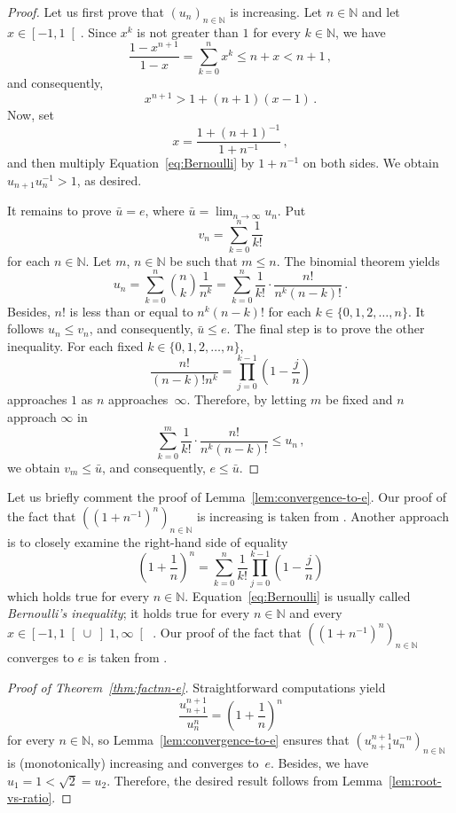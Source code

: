 \documentclass[12pt]{article}
\newcommand{\bN}{\mathbb{N}} %
\begin{document}
\begin{proof}
  Let us first prove that $\left( u_n \right)_{n \in \bN}$ is increasing.
  Let $n \in \bN$ and let $x \in \left[- 1, 1 \right[$.
  Since $x^k$ is not greater than $1$ for every $k \in \bN$,
  we have     
  $$
  \frac{1 - x^{n + 1}}{1 - x} = \sum_{k = 0}^n x^k \le n + x < n + 1 \,, 
  $$
  and consequently, 
  \begin{equation} \label{eq:Bernoulli}
  x^{n + 1} > 1 + (n + 1)(x - 1) \,.
  \end{equation}
  Now, set
  $$
  x = \frac{1 + {(n + 1)}^{-1}} {1 + n^{-1}} \,, 
  $$
  and then multiply Equation~\eqref{eq:Bernoulli} by $1 + n^{-1}$ on both sides.
  We obtain $u_{n + 1} u_n^{-1} > 1$, as desired.
  
  It remains to prove $\bar u = e$, where $\bar u = \lim_{n \to \infty} u_n$.
  Put
  $$
  v_n = \sum_{k = 0}^n \frac{1}{k!} 
  $$
  for each $n \in \bN$.
  Let $m$, $n \in \bN$ be such that $m \le n$.
  The binomial theorem yields
  $$
  u_n
  = \sum_{k = 0}^n  \binom{n}{k} \frac{1}{n^k}
  = \sum_{k = 0}^n \frac{1}{k!} \cdot \frac{n!}{n^k {(n - k)}!} \, .
  $$
  Besides, $n!$ is less than or equal to $n^k {(n - k)}!$ for each $k \in \{ 0, 1, 2, \dotsc, n \}$.
  It follows $ u_n \le v_n$,  and consequently, $\bar u \le e$.
  The final step is to prove the other inequality.
 For each fixed $k \in \{ 0, 1, 2, \dotsc, n \}$, 
  $$
  \frac{n!}{{(n - k)}! n^k} = \prod_{j = 0}^{k - 1} \left( 1 - \frac{j}{n} \right) 
 $$
 approaches $1$ as $n$ approaches~$\infty$.
 Therefore, by letting $m$ be fixed and $n$ approach $\infty$ in 
 $$
  \sum_{k = 0}^m \frac{1}{k!} \cdot \frac{n!}{n^k {(n - k)}!} \le u_n \,, 
  $$
  we obtain $v_m \le \bar u$, and consequently, $e \le \bar u$.
\end{proof}


Let us briefly comment the proof of Lemma~\ref{lem:convergence-to-e}.
Our proof of the fact that $\left( \left( 1 + n^{-1} \right)^n  \right)_{n \in \bN}$
is increasing is taken from \cite{Wiener85}.
Another approach \cite{GiaquintaModicaApprox} is to closely examine the right-hand side of equality 
$$ 
\left(1 + \frac{1}{n} \right)^n = \sum_{k = 0}^n \frac{1}{k!} \prod_{j = 0}^{k - 1} \left(1 - \frac{j}{n} \right) 
$$
which holds true for every $n \in \bN$.
Equation~\eqref{eq:Bernoulli} is usually called \emph{Bernoulli's inequality};
it holds true for every $n \in \bN$ and every
$x \in \left[- 1, 1 \right[ \cup \left]1, \infty \right[$ \cite{MitrinovicAI}.
Our proof of the fact that
$\left( \left( 1 + n^{-1} \right)^n  \right)_{n \in \bN}$ converges to $e$ is taken from \cite{RudinPrinciples}.


\begin{proof}[Proof of Theorem~\ref{thm:factnn-e}]
  Straightforward computations yield
  $$
  \frac{u_{n + 1}^{n + 1}}{u_n^n} 
  = \left(1 + \frac{1}{n} \right)^n  
  $$
  for every $n \in \bN$,
  so Lemma~\ref{lem:convergence-to-e} ensures that 
  $\left( u_{n + 1}^{n + 1} u_n^{- n} \right)_{n \in \bN}$ is (monotonically) increasing and converges to~$e$.
  Besides, we have $u_1 = 1 < \sqrt{2} = u_2$.
  Therefore, the desired result follows from Lemma~\ref{lem:root-vs-ratio}.
\end{proof} 



\end{document}
